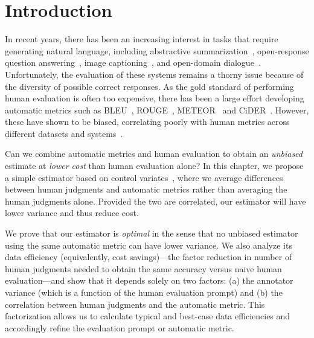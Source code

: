 \section{\label{sec:price:intro}Introduction}

In recent years, there has been an increasing interest in tasks that require generating natural language, including
  abstractive summarization~\citep{nallapati2016abstractive},
  open-response question answering~\citep{nguyen2016ms,kovcisky2017narrativeqa}, 
  image captioning~\citep{lin2014microsoft},
  and open-domain dialogue~\citep{lowe2017ubuntu}.
Unfortunately, the evaluation of these systems remains a thorny issue because of the diversity of possible correct responses.
As the gold standard of performing human evaluation is often too expensive,
there has been a large effort developing
automatic metrics such as BLEU~\citep{papineni02bleu}, ROUGE~\citep{lin2004rouge}, METEOR~\citep{lavie2009meteor,denkowski2014meteor} and CiDER~\citep{vedantam2015cider}.
However, these have shown to be biased, correlating poorly with human metrics across different datasets and systems~\citep{liu2016evaluate,novikova2017why}.

Can we combine automatic metrics and human evaluation to obtain
an \emph{unbiased} estimate at \emph{lower cost} than human evaluation alone?
In this chapter,
we propose a simple estimator based on control variates~\citep{ripley2009stochastic},
where we average differences between human judgments and automatic metrics
rather than averaging the human judgments alone.
Provided the two are correlated,
our estimator will have lower variance and thus reduce cost.

We prove that our estimator is \emph{optimal} in the sense
that no unbiased estimator using the same automatic metric can have lower variance.
We also analyze its data efficiency (equivalently, cost savings)---the factor reduction in number of human judgments needed to obtain the same accuracy versus naive human evaluation---and show that it depends solely on
two factors:
  (a) the annotator variance (which is a function of the human evaluation prompt) and
  (b) the correlation between human judgments and the automatic metric.
This factorization allows us to calculate typical and best-case data efficiencies and accordingly refine the evaluation prompt or automatic metric.

